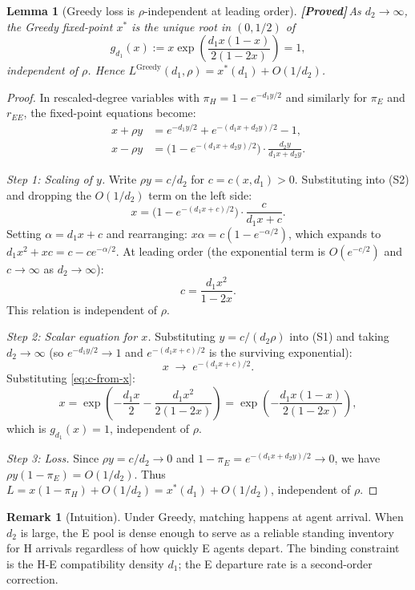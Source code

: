 \documentclass{article}
\theoremstyle{plain}
\newtheorem{lemma}{Lemma}
\theoremstyle{definition}
\newtheorem{remark}{Remark}
\newcommand{\proved}{\textcolor{provedgreen}{\textbf{[Proved]}}\,}
\begin{document}
\begin{lemma}[Greedy loss is $\rho$-independent at leading order]
\label{lem:greedy-rho-indep}
\proved As $d_2\to\infty$, the Greedy fixed-point $x^*$ is the unique root
in $(0,1/2)$ of
\[
  g_{d_1}(x)
    :=x\exp\!\left(\frac{d_1 x(1-x)}{2(1-2x)}\right)=1,
\]
independent of $\rho$.  Hence $L^{\mathrm{Greedy}}(d_1,\rho)=x^*(d_1)+O(1/d_2)$.
\end{lemma}

\begin{proof}
In rescaled-degree variables with $\pi_H=1-e^{-d_1 y/2}$ and similarly for
$\pi_E$ and $r_{EE}$, the fixed-point equations become:
\begin{align}
  x+\rho y
    &= e^{-d_1 y/2}+e^{-(d_1 x+d_2 y)/2}-1, \tag{S1}\\
  x-\rho y
    &= \bigl(1-e^{-(d_1 x+d_2 y)/2}\bigr)\cdot\frac{d_2 y}{d_1 x+d_2 y}.
    \tag{S2}
\end{align}

\emph{Step 1: Scaling of $y$.}
Write $\rho y=c/d_2$ for $c=c(x,d_1)>0$.  Substituting into (S2) and
dropping the $O(1/d_2)$ term on the left side:
\[
  x = \bigl(1-e^{-(d_1 x+c)/2}\bigr)\cdot\frac{c}{d_1 x+c}.
\]
Setting $\alpha=d_1 x+c$ and rearranging: $x\alpha=c(1-e^{-\alpha/2})$,
which expands to $d_1 x^2+xc=c-ce^{-\alpha/2}$.  At leading order (the
exponential term is $O(e^{-c/2})$ and $c\to\infty$ as $d_2\to\infty$):
\begin{equation}\label{eq:c-from-x}
  c = \frac{d_1 x^2}{1-2x}. \tag{$*$}
\end{equation}
This relation is independent of $\rho$.

\emph{Step 2: Scalar equation for $x$.}
Substituting $y=c/(d_2\rho)$ into (S1) and taking $d_2\to\infty$
(so $e^{-d_1 y/2}\to 1$ and $e^{-(d_1 x+c)/2}$ is the surviving
exponential):
\[
  x \;\longrightarrow\; e^{-(d_1 x+c)/2}.
\]
Substituting \eqref{eq:c-from-x}:
\[
  x = \exp\!\left(-\frac{d_1 x}{2}-\frac{d_1 x^2}{2(1-2x)}\right)
     = \exp\!\left(-\frac{d_1 x(1-x)}{2(1-2x)}\right),
\]
which is $g_{d_1}(x)=1$, independent of $\rho$.

\emph{Step 3: Loss.}
Since $\rho y=c/d_2\to 0$ and $1-\pi_E=e^{-(d_1 x+d_2 y)/2}\to 0$, we
have $\rho y(1-\pi_E)=O(1/d_2)$.  Thus
$L=x(1-\pi_H)+O(1/d_2)=x^*(d_1)+O(1/d_2)$, independent of $\rho$.
\end{proof}

\begin{remark}[Intuition]
Under Greedy, matching happens at agent arrival.  When $d_2$ is large, the
E pool is dense enough to serve as a reliable standing inventory for H
arrivals regardless of how quickly E agents depart.  The binding constraint
is the H-E compatibility density $d_1$; the E departure rate is a
second-order correction.
\end{remark}
\end{document}

